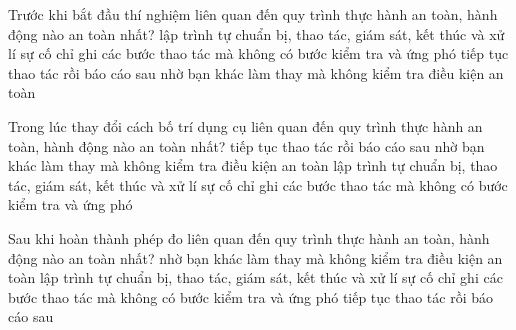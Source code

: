 



\begin{ex}
Trước khi bắt đầu thí nghiệm liên quan đến quy trình thực hành an toàn, hành động nào an toàn nhất?
\choice
{\True lập trình tự chuẩn bị, thao tác, giám sát, kết thúc và xử lí sự cố}
{chỉ ghi các bước thao tác mà không có bước kiểm tra và ứng phó}
{tiếp tục thao tác rồi báo cáo sau}
{nhờ bạn khác làm thay mà không kiểm tra điều kiện an toàn}
\end{ex}

\begin{ex}
Trong lúc thay đổi cách bố trí dụng cụ liên quan đến quy trình thực hành an toàn, hành động nào an toàn nhất?
\choice
{tiếp tục thao tác rồi báo cáo sau}
{nhờ bạn khác làm thay mà không kiểm tra điều kiện an toàn}
{\True lập trình tự chuẩn bị, thao tác, giám sát, kết thúc và xử lí sự cố}
{chỉ ghi các bước thao tác mà không có bước kiểm tra và ứng phó}
\end{ex}

\begin{ex}
Sau khi hoàn thành phép đo liên quan đến quy trình thực hành an toàn, hành động nào an toàn nhất?
\choice
{nhờ bạn khác làm thay mà không kiểm tra điều kiện an toàn}
{\True lập trình tự chuẩn bị, thao tác, giám sát, kết thúc và xử lí sự cố}
{chỉ ghi các bước thao tác mà không có bước kiểm tra và ứng phó}
{tiếp tục thao tác rồi báo cáo sau}
\end{ex}


